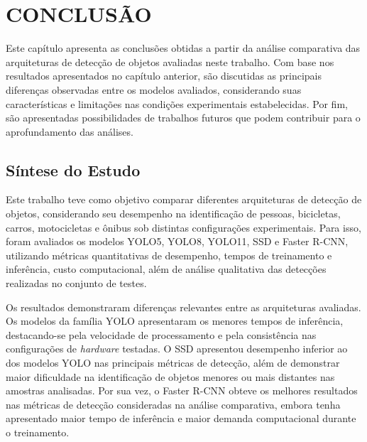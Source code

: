 \chapter{CONCLUSÃO}
\label{cap:conclusao}

Este capítulo apresenta as conclusões obtidas a partir da análise comparativa das
arquiteturas de detecção de objetos avaliadas neste trabalho. Com base nos resultados
apresentados no capítulo anterior, são discutidas as principais diferenças observadas entre
os modelos avaliados, considerando suas características e limitações nas condições
experimentais estabelecidas. Por fim, são apresentadas possibilidades de trabalhos futuros
que podem contribuir para o aprofundamento das análises.

\section{Síntese do Estudo}
\label{sec:sintese}

Este trabalho teve como objetivo comparar diferentes arquiteturas de detecção de objetos,
considerando seu desempenho na identificação de pessoas, bicicletas, carros, motocicletas e
ônibus sob distintas configurações experimentais. Para isso, foram avaliados os modelos
YOLO5, YOLO8, YOLO11, SSD e Faster R-CNN, utilizando métricas quantitativas de
desempenho, tempos de treinamento e inferência, custo computacional, além de análise
qualitativa das detecções realizadas no conjunto de testes.

Os resultados demonstraram diferenças relevantes entre as arquiteturas avaliadas. Os modelos
da família YOLO apresentaram os menores tempos de inferência, destacando-se pela velocidade
de processamento e pela consistência nas configurações de \textit{hardware} testadas. O SSD
apresentou desempenho inferior ao dos modelos YOLO nas principais métricas de detecção,
além de demonstrar maior dificuldade na identificação de objetos menores ou mais distantes
nas amostras analisadas. Por sua vez, o Faster R-CNN obteve os melhores resultados nas
métricas de detecção consideradas na análise comparativa, embora tenha apresentado maior
tempo de inferência e maior demanda computacional durante o treinamento.

